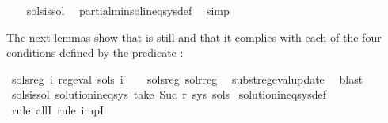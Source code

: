 \begin{isabellebody}
%
\isadelimproof
\ \ %
\endisadelimproof
%
\isatagproof
{}\isamarkupfalse%
\ sols{\isacharunderscore}{\kern0pt}is{\isacharunderscore}{\kern0pt}sol\ \isamarkupfalse%
\ partial{\isacharunderscore}{\kern0pt}min{\isacharunderscore}{\kern0pt}sol{\isacharunderscore}{\kern0pt}ineq{\isacharunderscore}{\kern0pt}sys{\isacharunderscore}{\kern0pt}def\ \isamarkupfalse%
\ simp%
\endisatagproof
{\isafoldproof}%
%
\isadelimproof
%
\endisadelimproof
%
\begin{isamarkuptext}%
The next lemmas show that  is still  and that it complies with
each of the four conditions defined by the predicate :%
\end{isamarkuptext}\isamarkuptrue%
\isamarkupfalse%
\ sols{\isacharprime}{\kern0pt}{\isacharunderscore}{\kern0pt}reg{\isacharcolon}{\kern0pt}\ {\isachardoublequoteopen}{\isasymforall}i{\isachardot}{\kern0pt}\ reg{\isacharunderscore}{\kern0pt}eval\ {\isacharparenleft}{\kern0pt}sols{\isacharprime}{\kern0pt}\ i{\isacharparenright}{\kern0pt}{\isachardoublequoteclose}\isanewline
%
\isadelimproof
\ \ %
\endisadelimproof
%
\isatagproof
{}\isamarkupfalse%
\ sols{\isacharunderscore}{\kern0pt}reg\ sol{\isacharunderscore}{\kern0pt}r{\isacharunderscore}{\kern0pt}reg\ \isamarkupfalse%
\ subst{\isacharunderscore}{\kern0pt}reg{\isacharunderscore}{\kern0pt}eval{\isacharunderscore}{\kern0pt}update\ \isamarkupfalse%
\ blast%
\endisatagproof
{\isafoldproof}%
%
\isadelimproof
\isanewline
%
\endisadelimproof
\isanewline
{}\isamarkupfalse%
\ sols{\isacharprime}{\kern0pt}{\isacharunderscore}{\kern0pt}is{\isacharunderscore}{\kern0pt}sol{\isacharcolon}{\kern0pt}\ {\isachardoublequoteopen}solution{\isacharunderscore}{\kern0pt}ineq{\isacharunderscore}{\kern0pt}sys\ {\isacharparenleft}{\kern0pt}take\ {\isacharparenleft}{\kern0pt}Suc\ r{\isacharparenright}{\kern0pt}\ sys{\isacharparenright}{\kern0pt}\ sols{\isacharprime}{\kern0pt}{\isachardoublequoteclose}\isanewline
%
\isadelimproof
%
\endisadelimproof
%
\isatagproof
{}\isamarkupfalse%
\ solution{\isacharunderscore}{\kern0pt}ineq{\isacharunderscore}{\kern0pt}sys{\isacharunderscore}{\kern0pt}def\ \isamarkupfalse%
\ {\isacharparenleft}{\kern0pt}rule\ allI{\isacharcomma}{\kern0pt}\ rule\ impI{\isacharparenright}{\kern0pt}\isanewline

\end{isabellebody}
